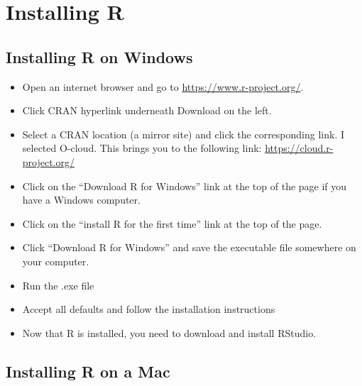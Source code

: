 \documentclass[
  letterpaper,
  DIV=11,
  numbers=noendperiod]{scrreprt}
\providecommand{\tightlist}{%
  \setlength{\itemsep}{0pt}\setlength{\parskip}{0pt}}\usepackage{longtable,booktabs,array}
\begin{document}

\chapter{Installing R}\label{installing-r}

\section{Installing R on Windows}\label{installing-r-on-windows}

\begin{itemize}
\tightlist
\item
  Open an internet browser and go to \url{https://www.r-project.org/}.
\item
  Click CRAN hyperlink underneath Download on the left.
\item
  Select a CRAN location (a mirror site) and click the corresponding
  link. I selected O-cloud. This brings you to the following link:
  \url{https://cloud.r-project.org/}
\item
  Click on the ``Download R for Windows'' link at the top of the page if
  you have a Windows computer.\\
\item
  Click on the ``install R for the first time'' link at the top of the
  page.
\item
  Click ``Download R for Windows'' and save the executable file
  somewhere on your computer.
\item
  Run the .exe file
\item
  Accept all defaults and follow the installation instructions
\item
  Now that R is installed, you need to download and install RStudio.
\end{itemize}

\section{Installing R on a Mac}\label{installing-r-on-a-mac}
\end{document}
